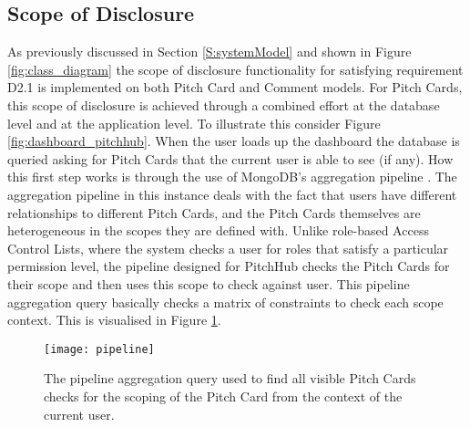 \subsection{Scope of Disclosure}
As previously discussed in Section \ref{S:systemModel} and shown in Figure \ref{fig:class_diagram} the scope of disclosure functionality for satisfying requirement D2.1 is implemented on both Pitch Card and Comment models. For Pitch Cards, this scope of disclosure is achieved through a combined effort at the database level and at the application level. To illustrate this consider Figure \ref{fig:dashboard_pitchhub}. When the user loads up the dashboard the database is queried asking for Pitch Cards that the current user is able to see (if any). How this first step works is through the use of MongoDB's aggregation pipeline \cite{Aggre7:online}. The aggregation pipeline in this instance deals with the fact that users have different relationships to different Pitch Cards, and the Pitch Cards themselves are heterogeneous in the scopes they are defined with. Unlike role-based Access Control Lists, where the system checks a user for roles that satisfy a particular permission level, the pipeline designed for PitchHub checks the Pitch Cards for their scope and then uses this scope to check against user. This pipeline aggregation query basically checks a matrix of constraints to check each scope context. This is visualised in Figure \ref{fig:pipeline}.

\begin{figure}[ht]
    \centering
    \texttt{[image: pipeline]}
    \caption{The pipeline aggregation query used to find all visible Pitch Cards checks for the scoping of the Pitch Card from the context of the current user.}
    \label{fig:pipeline}
\end{figure}

